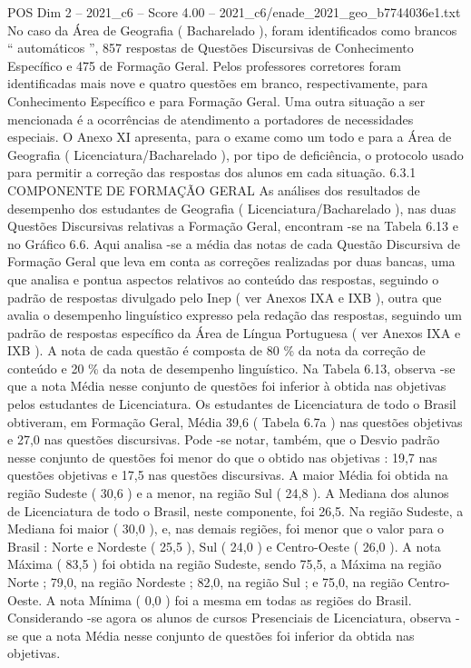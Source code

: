 \begin{textsample}{POS Dim 2 – 2021\_c6 – Score 4.00 – 2021\_c6/enade\_2021\_geo\_b7744036e1.txt}
No caso da Área de Geografia ( Bacharelado ), foram identificados como brancos “ automáticos ”, 857 respostas de Questões Discursivas de Conhecimento Específico e 475 de Formação Geral.
Pelos professores corretores foram identificadas mais nove e quatro questões em branco, respectivamente, para Conhecimento Específico e para Formação Geral.
Uma outra situação a ser mencionada é a ocorrências de atendimento a portadores de necessidades especiais.
O Anexo XI apresenta, para o exame como um todo e para a Área de Geografia ( Licenciatura/Bacharelado ), por tipo de deficiência, o protocolo usado para permitir a correção das respostas dos alunos em cada situação. 6.3.1 COMPONENTE DE FORMAÇÃO GERAL As análises dos resultados de desempenho dos estudantes de Geografia ( Licenciatura/Bacharelado ), nas duas Questões Discursivas relativas a Formação Geral, encontram -se na Tabela 6.13 e no Gráfico 6.6.
Aqui analisa -se a média das notas de cada Questão Discursiva de Formação Geral que leva em conta as correções realizadas por duas bancas, uma que analisa e pontua aspectos relativos ao conteúdo das respostas, seguindo o padrão de respostas divulgado pelo Inep ( ver Anexos IXA e IXB ), outra que avalia o desempenho linguístico expresso pela redação das respostas, seguindo um padrão de respostas específico da Área de Língua Portuguesa ( ver Anexos IXA e IXB ).
A nota de cada questão é composta de 80 \% da nota da correção de conteúdo e 20 \% da nota de desempenho linguístico.
Na Tabela 6.13, observa -se que a nota Média nesse conjunto de questões foi inferior à obtida nas objetivas pelos estudantes de Licenciatura.
Os estudantes de Licenciatura de todo o Brasil obtiveram, em Formação Geral, Média 39,6 ( Tabela 6.7a ) nas questões objetivas e 27,0 nas questões discursivas.
Pode -se notar, também, que o Desvio padrão nesse conjunto de questões foi menor do que o obtido nas objetivas : 19,7 nas questões objetivas e 17,5 nas questões discursivas.
A maior Média foi obtida na região Sudeste ( 30,6 ) e a menor, na região Sul ( 24,8 ).
A Mediana dos alunos de Licenciatura de todo o Brasil, neste componente, foi 26,5.
Na região Sudeste, a Mediana foi maior ( 30,0 ), e, nas demais regiões, foi menor que o valor para o Brasil : Norte e Nordeste ( 25,5 ), Sul ( 24,0 ) e Centro-Oeste ( 26,0 ).
A nota Máxima ( 83,5 ) foi obtida na região Sudeste, sendo 75,5, a Máxima na região Norte ; 79,0, na região Nordeste ; 82,0, na região Sul ; e 75,0, na região Centro-Oeste.
A nota Mínima ( 0,0 ) foi a mesma em todas as regiões do Brasil.
Considerando -se agora os alunos de cursos Presenciais de Licenciatura, observa -se que a nota Média nesse conjunto de questões foi inferior da obtida nas objetivas.

\end{textsample}
